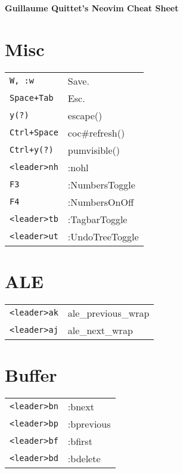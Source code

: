 




\raggedright
\footnotesize

\begin{center}
	\Huge{\textbf{Guillaume Quittet's Neovim Cheat Sheet}} \\
\end{center}
\vspace*{0.5cm}

\begin{multicols}{3}


\setlength{\premulticols}{1pt}
\setlength{\postmulticols}{1pt}
\setlength{\multicolsep}{1pt}
\setlength{\columnsep}{2pt}

\section{Misc}
\begin{tabular}{@{}ll@{}}
	\verb!W, :w! & Save. \\
	\verb!Space+Tab! & Esc. \\
    \verb!y(?)! & escape() \\
	\verb!Ctrl+Space! & coc\#refresh()\\
    \verb!Ctrl+y(?)! & pumvisible() \\
    \verb!<leader>nh! & :nohl \\
    \verb!F3! & :NumbersToggle \\
    \verb!F4! & :NumbersOnOff \\
    \verb!<leader>tb! & :TagbarToggle \\
    \verb!<leader>ut! & :UndoTreeToggle \\
\end{tabular}

\section{ALE}
\begin{tabular}{@{}ll@{}}
	\verb!<leader>ak! & ale\_previous\_wrap \\
	\verb!<leader>aj! & ale\_next\_wrap \\
\end{tabular}

\section{Buffer}
\begin{tabular}{@{}ll@{}}
	\verb!<leader>bn! & :bnext \\
	\verb!<leader>bp! & :bprevious \\
	\verb!<leader>bf! & :bfirst \\
	\verb!<leader>bd! & :bdelete \\
\end{tabular}


\end{multicols}

